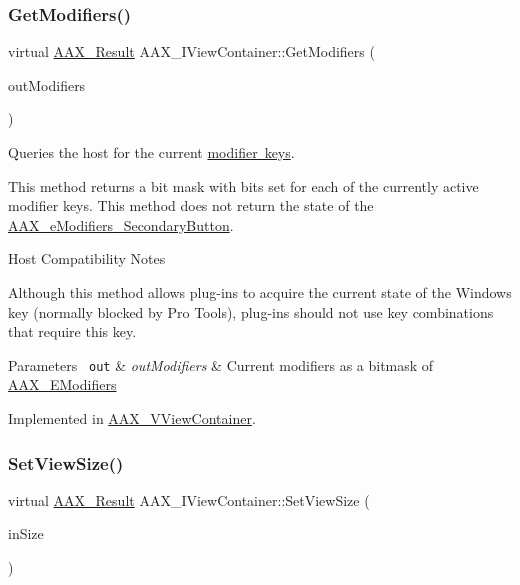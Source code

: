 \subsubsection{\texorpdfstring{GetModifiers()}{GetModifiers()}}
{\footnotesize\ttfamily virtual \mbox{\hyperlink{a00392_a4d8f69a697df7f70c3a8e9b8ee130d2f}{A\+A\+X\+\_\+\+Result}} A\+A\+X\+\_\+\+I\+View\+Container\+::\+Get\+Modifiers (\begin{DoxyParamCaption}\item[{uint32\+\_\+t $\ast$}]{out\+Modifiers }\end{DoxyParamCaption})\hspace{0.3cm}{\ttfamily [pure virtual]}}



Queries the host for the current \mbox{\hyperlink{a00491_a47756e0a56d00468b7045eb26500cb78}{modifier keys}}. 

This method returns a bit mask with bits set for each of the currently active modifier keys. This method does not return the state of the \mbox{\hyperlink{a00491_a47756e0a56d00468b7045eb26500cb78a6d7914ad68992fa2670fc0327704cbb7}{A\+A\+X\+\_\+e\+Modifiers\+\_\+\+Secondary\+Button}}.

\begin{DoxyRefDesc}{Host Compatibility Notes}
\item[\mbox{\hyperlink{a00786__compatibility_notes000064}{Host Compatibility Notes}}]Although this method allows plug-\/ins to acquire the current state of the Windows key (normally blocked by Pro Tools), plug-\/ins should not use key combinations that require this key.\end{DoxyRefDesc}



\begin{DoxyParams}[1]{Parameters}
\mbox{\texttt{ out}}  & {\em out\+Modifiers} & Current modifiers as a bitmask of \mbox{\hyperlink{a00491_a47756e0a56d00468b7045eb26500cb78}{A\+A\+X\+\_\+\+E\+Modifiers}} \\
\hline
\end{DoxyParams}


Implemented in \mbox{\hyperlink{a01945_acdc71a4c6bd536bbd3be11635c1ff514}{A\+A\+X\+\_\+\+V\+View\+Container}}.

\mbox{\label{a01889_ad750e9f0231c61ab32114276ee8cb5f7}} 
\subsubsection{\texorpdfstring{SetViewSize()}{SetViewSize()}}
{\footnotesize\ttfamily virtual \mbox{\hyperlink{a00392_a4d8f69a697df7f70c3a8e9b8ee130d2f}{A\+A\+X\+\_\+\+Result}} A\+A\+X\+\_\+\+I\+View\+Container\+::\+Set\+View\+Size (\begin{DoxyParamCaption}\item[{\mbox{\hyperlink{a01609}{A\+A\+X\+\_\+\+Point}} \&}]{in\+Size }\end{DoxyParamCaption})\hspace{0.3cm}{\ttfamily [pure virtual]}}



